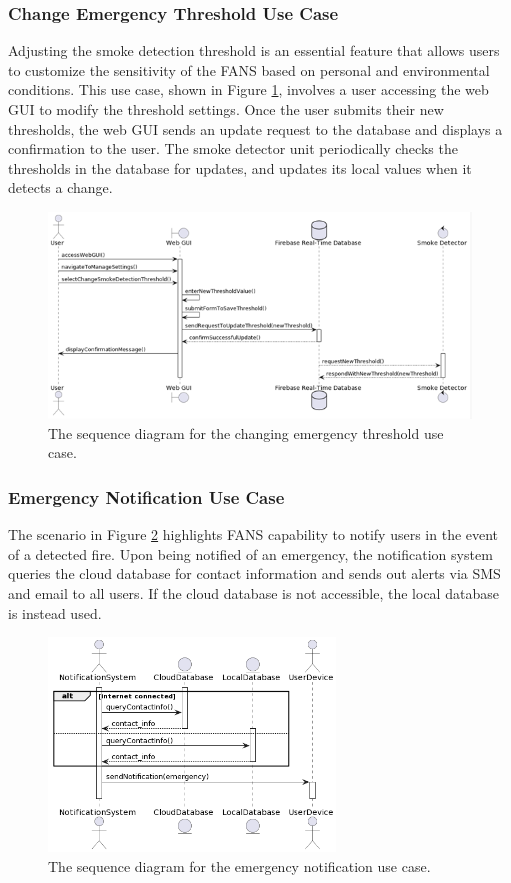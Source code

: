 \subsubsection{Change Emergency Threshold Use Case}

Adjusting the smoke detection threshold is an essential feature that allows users to customize the sensitivity of the
FANS based on personal and environmental conditions. This use case, shown in Figure \ref{fig:change-thresh}, involves a
user accessing the web GUI to modify the threshold settings. Once the user submits their new thresholds, the web GUI
sends an update request to the database and displays a confirmation to the user. The smoke detector unit periodically
checks the thresholds in the database for updates, and updates its local values when it detects a change.

\begin{figure}
    \centering
    \includegraphics[width=\imagewidth]{../assets/sequence/ChangingSmokeDetectionThresholdSequenceDiagram.png}
    \caption{The sequence diagram for the changing emergency threshold use case.}
    \label{fig:change-thresh}
\end{figure}

\subsubsection{Emergency Notification Use Case}

The scenario in Figure \ref{fig:emergency-resp} highlights FANS capability to notify users in the event of a detected
fire. Upon being notified of an emergency, the notification system queries the cloud database for contact information
and sends out alerts via SMS and email to all users. If the cloud database is not accessible, the local database is
instead used.

\begin{figure}
    \centering
    \includegraphics[width=3in]{../assets/sequence/EmergencyResponseUseCase.png}
    \caption{The sequence diagram for the emergency notification use case.}
    \label{fig:emergency-resp}
\end{figure}
